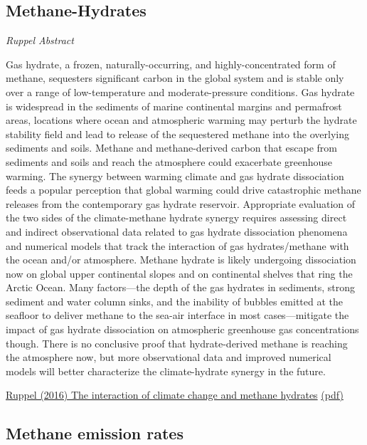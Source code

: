 \documentclass[
]{book}
\begin{document}
\hypertarget{methane-hydrates}{%
\subsection{Methane-Hydrates}\label{methane-hydrates}}

\emph{Ruppel Abstract}

Gas hydrate, a frozen, naturally-occurring, and highly-concentrated form of methane, sequesters significant carbon in the global system and is stable only over a range of low-temperature and moderate-pressure conditions. Gas hydrate is widespread in the sediments of marine continental margins and permafrost areas, locations where ocean and atmospheric warming may perturb the hydrate stability field and lead to release of the sequestered methane into the overlying sediments and soils. Methane and methane-derived carbon that escape from sediments and soils and reach the atmosphere could exacerbate greenhouse warming. The synergy between warming climate and gas hydrate dissociation feeds a popular perception that global warming could drive catastrophic methane releases from the contemporary gas hydrate reservoir. Appropriate evaluation of the two sides of the climate-methane hydrate synergy requires assessing direct and indirect observational data related to gas hydrate dissociation phenomena and numerical models that track the interaction of gas hydrates/methane with the ocean and/or atmosphere. Methane hydrate is likely undergoing dissociation now on global upper continental slopes and on continental shelves that ring the Arctic Ocean. Many factors---the depth of the gas hydrates in sediments, strong sediment and water column sinks, and the inability of bubbles emitted at the seafloor to deliver methane to the sea-air interface in most cases---mitigate the impact of gas hydrate dissociation on atmospheric greenhouse gas concentrations though. There is no conclusive proof that hydrate-derived methane is reaching the atmosphere now, but more observational data and improved numerical models will better characterize the climate-hydrate synergy in the future.

\href{https://agupubs.onlinelibrary.wiley.com/doi/full/10.1002/2016RG000534}{Ruppel (2016) The interaction of climate change and methane hydrates}
\href{pdf/Ruppel_2016_Methane_Hydrates.pdf}{(pdf)}

\hypertarget{methane-emission-rates}{%
\subsection{Methane emission rates}\label{methane-emission-rates}}
\end{document}

